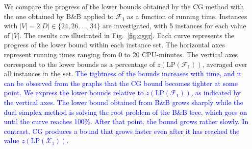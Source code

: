 We compare the progress of the lower bounds obtained by the CG method with the one obtained by B\&B applied to $\mathcal{F}_1$ as a function of running time.
Instances with $|V|=2|D|\in\{24, 26,\ldots, 34\}$ are investigated, with 5 instances for each value of $|V|$.
The results are illustrated in Fig.\ \ref{fig:cggr}.
Each curve represents the progress of the lower bound within each instance set.
The horizontal axes represent running times ranging from 0 to 20 CPU-minutes.
The vertical axes correspond to the lower bounds as a percentage of $z\left(\text{LP}(\mathcal{F}_1)\right)$, averaged over all instances in the set.
\textcolor{blue}{
The tightness of the bounds increases with time, and it can be observed from the graphs that the CG bound becomes tighter at some point.
We express the lower bounds relative to $z\left(\text{LP}(\mathcal{F}_1)\right)$, as indicated by the vertical axes.
The lower bound obtained from B\&B grows sharply while the dual simplex method is solving the root problem of the B\&B tree, 
which goes on until the curve reaches 100\%.
After that point, the bound grows rather slowly.
In contrast, CG produces a bound that grows faster even after it has reached the value $z\left(\text{LP}(\mathcal{X}_1)\right)$.}


